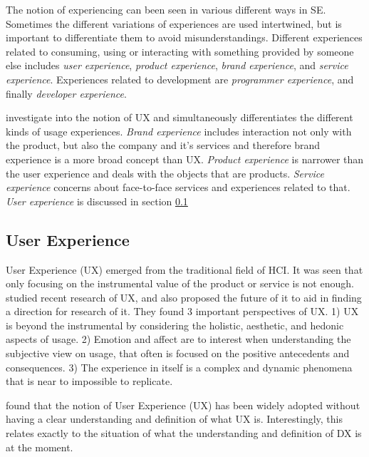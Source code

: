 \documentclass[english, 12pt, a4paper, sci, utf8, a-1b, online]{aaltothesis}
\begin{document}
The notion of experiencing can been seen in various different ways in SE. Sometimes the different variations of experiences are used intertwined, but is important to differentiate them to avoid misunderstandings. Different experiences related to consuming, using or interacting with something provided by someone else includes \textit{user experience}, \textit{product experience}, \textit{brand experience}, and \textit{service experience}. Experiences related to development are \textit{programmer experience}, and finally \textit{developer experience}.

\textcite{understanding-ux} investigate into the notion of UX and simultaneously differentiates the different kinds of usage experiences. \textit{Brand experience} includes interaction not only with the product, but also the company and it's services and therefore brand experience is a more broad concept than UX. \textit{Product experience} is narrower than the user experience and deals with the objects that are products. \textit{Service experience} concerns about face-to-face services and experiences related to that. \textit{User experience} is discussed in section \ref{section:ux}

\subsection{User Experience} \label{section:ux}

User Experience (UX) emerged from the traditional field of HCI. It was seen that only focusing on the instrumental value of the product or service is not enough. \textcite{ux-research-agenda} studied recent research of UX, and also proposed the future of it to aid in finding a direction for research of it. They found 3 important perspectives of UX. 1) UX is beyond the instrumental by considering the holistic, aesthetic, and hedonic aspects of usage. 2) Emotion and affect are to interest when understanding the subjective view on usage, that often is focused on the positive antecedents and consequences. 3) The experience in itself is a complex and dynamic phenomena that is near to impossible to replicate.

\textcite{understanding-ux} found that the notion of User Experience (UX) has been widely adopted without having a clear understanding and definition of what UX is. Interestingly, this relates exactly to the situation of what the understanding and definition of DX is at the moment.

\end{document}
